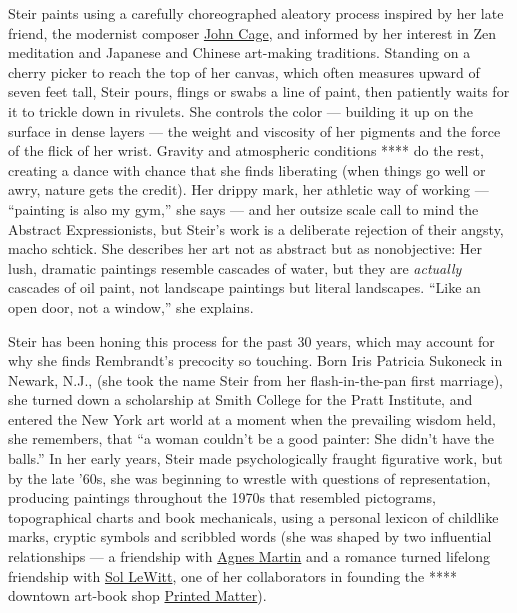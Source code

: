 Steir paints using a carefully choreographed aleatory process inspired
by her late friend, the modernist composer
\href{https://www.nytimes3xbfgragh.onion/topic/person/john-cage}{John
Cage}, and informed by her interest in Zen meditation and Japanese and
Chinese art-making traditions. Standing on a cherry picker to reach the
top of her canvas, which often measures upward of seven feet tall, Steir
pours, flings or swabs a line of paint, then patiently waits for it to
trickle down in rivulets. She controls the color --- building it up on
the surface in dense layers --- the weight and viscosity of her pigments
and the force of the flick of her wrist. Gravity and atmospheric
conditions **** do the rest, creating a dance with chance that she finds
liberating (when things go well or awry, nature gets the credit). Her
drippy mark, her athletic way of working --- ``painting is also my
gym,'' she says --- and her outsize scale call to mind the Abstract
Expressionists, but Steir's work is a deliberate rejection of their
angsty, macho schtick. She describes her art not as abstract but as
nonobjective: Her lush, dramatic paintings resemble cascades of water,
but they are \emph{actually} cascades of oil paint, not landscape
paintings but literal landscapes. ``Like an open door, not a window,''
she explains.

Steir has been honing this process for the past 30 years, which may
account for why she finds Rembrandt's precocity so touching. Born Iris
Patricia Sukoneck in Newark, N.J., (she took the name Steir from her
flash-in-the-pan first marriage), she turned down a scholarship at Smith
College for the Pratt Institute, and entered the New York art world at a
moment when the prevailing wisdom held, she remembers, that ``a woman
couldn't be a good painter: She didn't have the balls.'' In her early
years, Steir made psychologically fraught figurative work, but by the
late '60s, she was beginning to wrestle with questions of
representation, producing paintings throughout the 1970s that resembled
pictograms, topographical charts and book mechanicals, using a personal
lexicon of childlike marks, cryptic symbols and scribbled words (she was
shaped by two influential relationships --- a friendship with
\href{https://www.nytimes3xbfgragh.onion/2004/12/17/arts/design/agnes-martin-abstract-painter-dies-at-92.html}{Agnes
Martin} and a romance turned lifelong friendship with
\href{https://www.nytimes3xbfgragh.onion/2007/04/09/arts/design/09lewitt.html}{Sol
LeWitt}, one of her collaborators in founding the **** downtown art-book
shop \href{https://www.printedmatter.org/}{Printed Matter}).


